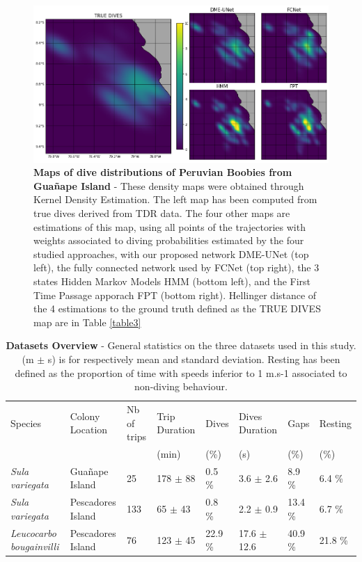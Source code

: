 \documentclass{article}
\begin{document}
\begin{figure}[h]
  \centering
  \includegraphics[scale=0.5]{figure5.png}
  \caption{\textbf{Maps of dive distributions of Peruvian Boobies from Gua\~nape Island} - These density maps were obtained through Kernel Density Estimation. The left map has been computed from true dives derived from TDR data. The four other maps are estimations of this map, using  all points of the trajectories with weights associated to diving probabilities estimated by the four studied approaches,  with our proposed network DME-UNet (top left), the fully connected network used by \cite{browning_predicting_2018}  FCNet (top right), the 3 states Hidden Markov Models HMM (bottom left), and the First Time Passage apporach FPT (bottom right). Hellinger distance of the 4 estimations to the ground truth defined as the TRUE DIVES map are in Table \ref{table3}}
  \label{figure5}
\end{figure}

\begin{table}[h]
 \caption{\textbf{Datasets Overview} - General statistics on the three datasets used in this study. (m $\pm$ s) is for respectively mean and standard deviation. Resting has been defined as the proportion of time with speeds inferior to 1 m.s-1 associated to non-diving behaviour.}
  \centering
  \begin{tabular}{llllllll}
    \toprule
    Species  &  Colony Location & Nb of trips  & Trip Duration & Dives  & Dives Duration & Gaps & Resting \\
      &    &     & (min) & (\%) & (s) & (\%) & (\%) \\
    \midrule
    \textit{Sula variegata}         & Gua\~nape Island    & 25   & 178 $\pm$ 88  & 0.5 \%  & 3.6 $\pm$ 2.6 & 8.9 \% & 6.4 \%\\
    \textit{Sula variegata}         & Pescadores Island & 133 & 65 $\pm$ 43  & 0.8 \%  & 2.2 $\pm$ 0.9  & 13.4 \% & 6.7 \%\\
    \textit{Leucocarbo bougainvilli}& Pescadores Island & 76   & 123 $\pm$ 45  & 22.9 \%  & 17.6 $\pm$ 12.6 & 40.9 \% & 21.8 \%\\
    \bottomrule
  \end{tabular}
  \label{table1}
\end{table}
\end{document}
